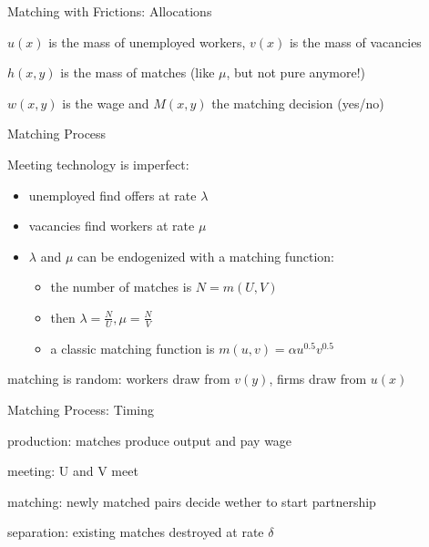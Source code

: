 \documentclass{beamer}%
\begin{document}
\begin{frame}{Matching with Frictions: Allocations}
\begin{midi}
\item $u(x)$ is the mass of unemployed workers, $v(x)$ is the mass of vacancies
\item $h(x,y)$ is the mass of matches (like $\mu$, but not pure anymore!)
\item $w(x,y)$ is the wage and $M(x,y)$ the matching decision (yes/no)
\end{midi}
\end{frame}

\begin{frame}{Matching Process}
\begin{widei}
\item Meeting technology is imperfect:
\begin{itemize}
\item unemployed find offers at rate $\lambda$
\item vacancies find workers at rate $\mu$
\item $\lambda$ and $\mu$ can be endogenized with a matching function:
\begin{itemize}
	\item the number of matches is $N=m(U,V)$
	\item then $\lambda = \frac{N}{U}, \mu=\frac{N}{V}$
	\item a classic matching function is $m(u,v)=\alpha u^{0.5} v^{0.5}$
\end{itemize}
\end{itemize}
\item matching is random: workers draw from $v(y)$, firms draw from $u(x)$
\end{widei}
\end{frame}

\begin{frame}{Matching Process: Timing}
\begin{widee}
\item production: matches produce output and pay wage
\item meeting: U and V meet
\item matching: newly matched pairs decide wether to start partnership
\item separation: existing matches destroyed at rate $\delta$
\end{widee}
\end{frame}
\end{document}

